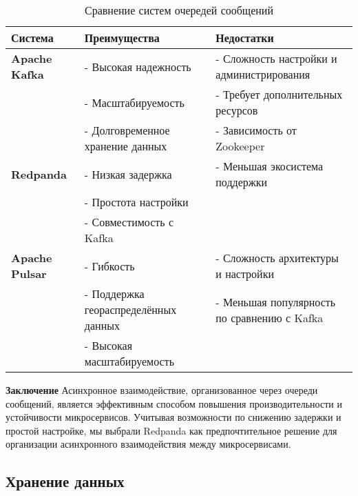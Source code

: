 \begin{table}[h]
    \centering
    \begin{tabular}{|l|l|l|}
        \hline
        \textbf{Система}            & \textbf{Преимущества}                          & \textbf{Недостатки}                                \\ \hline
        \textbf{Apache Kafka}       & - Высокая надежность                    & - Сложность настройки и администрирования     \\ \hline
                                   & - Масштабируемость                       & - Требует дополнительных ресурсов              \\ \hline
                                   & - Долговременное хранение данных         & - Зависимость от Zookeeper                      \\ \hline
        \textbf{Redpanda}           & - Низкая задержка                        & - Меньшая экосистема поддержки                 \\ \hline
                                   & - Простота настройки                     &                                                \\ \hline
                                   & - Совместимость с Kafka                 &                                                \\ \hline
        \textbf{Apache Pulsar}      & - Гибкость                               & - Сложность архитектуры и настройки            \\ \hline
                                   & - Поддержка геораспределённых данных    & - Меньшая популярность по сравнению с Kafka    \\ \hline
                                   & - Высокая масштабируемость              &                                                \\ \hline
    \end{tabular}
    \caption{Сравнение систем очередей сообщений}
\end{table}


\textbf{Заключение}
Асинхронное взаимодействие, организованное через очереди сообщений, является эффективным способом повышения производительности и устойчивости микросервисов. Учитывая возможности по снижению задержки и простой настройке, мы выбрали Redpanda как предпочтительное решение для организации асинхронного взаимодействия между микросервисами.


\subsection{Хранение данных} %


